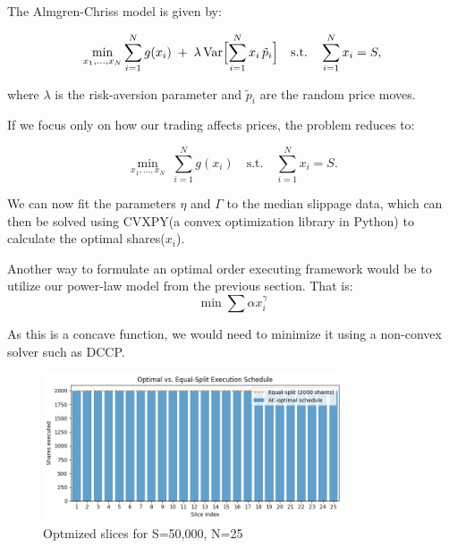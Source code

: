 \documentclass[12pt, letterpaper]{article}
\begin{document}
The Almgren-Chriss model is given by:

\[
  \min_{x_1,\dots,x_N}
    \sum_{i=1}^N g(x_i)
    \;+\;\lambda\,\mathrm{Var}\Bigl[\sum_{i=1}^N x_i\,\tilde p_i\Bigr]
  \quad\text{s.t.}\quad
    \sum_{i=1}^N x_i = S,
\]

where \(\lambda\) is the risk‐aversion parameter and \(\tilde p_i\) are the random price moves.

If we focus only on how our trading affects prices, the problem reduces to:

\[
  \min_{x_1,\ldots,x_N}\;
    \sum_{i=1}^N g(x_i)
  \quad\text{s.t.}\quad
    \sum_{i=1}^N x_i = S.
\]


We can now fit the parameters $\eta$ and $\Gamma$ to the median slippage data, which can then be solved using CVXPY(a convex optimization library in Python) to calculate the optimal shares($x_i$).


\vspace{1em}

Another way to formulate an optimal order executing framework would be to utilize our power-law model from the previous section. That is:
\[\min \sum \alpha x_i^\gamma\]


As this is a concave function, we would need to minimize it using a non-convex solver such as DCCP.




\begin{figure}[h!] %
    \centering
    \includegraphics[width=0.79\textwidth]{res/images/optimized_slices_test.png} %
    \caption{Optmized slices for S=50,000, N=25}
    \label{fig:optimized_strategy} 
\end{figure}
\end{document}
